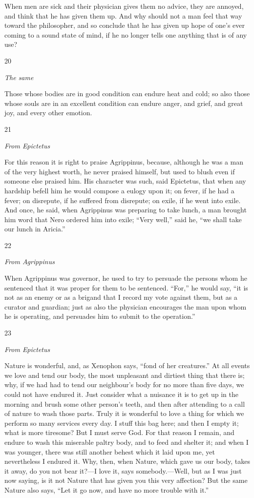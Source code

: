 When men are sick and their physician gives them no advice, they are annoyed, and think that he has given them up. And why should not a man feel that way toward the philosopher, and so conclude that he has given up hope of one's ever coming to a sound state of mind, if he no longer tells one anything that is of any use?

20

\emph{The same}

Those whose bodies are in good condition can endure heat and cold; so also those whose souls are in an excellent condition can endure anger, and grief, and great joy, and every other emotion.

21

\emph{From Epictetus}

For this reason it is right to praise Agrippinus, because, although he was a man of the very highest worth, he never praised himself, but used to blush even if someone else praised him. His character was such, said Epictetus, that when any hardship befell him he would compose a eulogy upon it; on fever, if he had a fever; on disrepute, if he suffered from disrepute; on exile, if he went into exile. And once, he said, when Agrippinus was preparing to take lunch, a man brought him word that Nero ordered him into exile; ``Very well,'' said he, ``we shall take our lunch in Aricia.''

22

\emph{From Agrippinus}

When Agrippinus was governor, he used to try to persuade the persons whom he sentenced that it was proper for them to be sentenced. ``For,'' he would say, ``it is not as an enemy or as a brigand that I record my vote against them, but as a curator and guardian; just as also the physician encourages the man upon whom he is operating, and persuades him to submit to the operation.''

23

\emph{From Epictetus}

Nature is wonderful, and, as Xenophon says, ``fond of her creatures.'' At all events we love and tend our body, the most unpleasant and dirtiest thing that there is; why, if we had had to tend our neighbour's body for no more than five days, we could not have endured it. Just consider what a nuisance it is to get up in the morning and brush some other person's teeth, and then after attending to a call of nature to wash those parts. Truly it is wonderful to love a thing for which we perform so many services every day. I stuff this bag here; and then I empty it; what is more tiresome? But I must serve God. For that reason I remain, and endure to wash this miserable paltry body, and to feed and shelter it; and when I was younger, there was still another behest which it laid upon me, yet nevertheless I endured it. Why, then, when Nature, which gave us our body, takes it away, do you not bear it?—I love it, says somebody.—Well, but as I was just now saying, is it not Nature that has given you this very affection? But the same Nature also says, ``Let it go now, and have no more trouble with it.''

